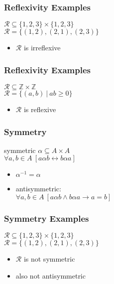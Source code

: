 \documentclass[dvipsnames]{beamer}
\begin{document}
\begin{frame}
  \frametitle{Reflexivity Examples}

  $\mathcal{R} \subseteq \{1,2,3\} \times \{1,2,3\}$\\
  $\mathcal{R} = \{(1,2), (2,1), (2,3)\}$

  \medskip
  \begin{itemize}
    \item $\mathcal{R}$ is irreflexive
  \end{itemize}
\end{frame}

\begin{frame}
  \frametitle{Reflexivity Examples}

  $\mathcal{R} \subseteq \mathbb{Z} \times \mathbb{Z}$\\
  $\mathcal{R} = \{(a,b)~|~ab \geq 0\}$

  \medskip
  \begin{itemize}
    \item $\mathcal{R}$ is reflexive
  \end{itemize}
\end{frame}

\begin{frame}
  \frametitle{Symmetry}

  \begin{block}{symmetric}
    $\alpha \subseteq A \times A$\\
    $\forall a,b \in A~[a \alpha b \leftrightarrow b \alpha a]$
  \end{block}

  \pause
  \begin{itemize}
    \item $\alpha^{-1} = \alpha$

    \pause
    \item antisymmetric:\\
      $\forall a,b \in A~[a \alpha b \wedge b \alpha a \rightarrow a=b]$
  \end{itemize}
\end{frame}

\begin{frame}
  \frametitle{Symmetry Examples}

  $\mathcal{R} \subseteq \{1,2,3\} \times \{1,2,3\}$\\
  $\mathcal{R} = \{(1,2), (2,1), (2,3)\}$

  \medskip
  \begin{itemize}
    \item $\mathcal{R}$ is not symmetric
    \item also not antisymmetric
  \end{itemize}
\end{frame}
\end{document}
